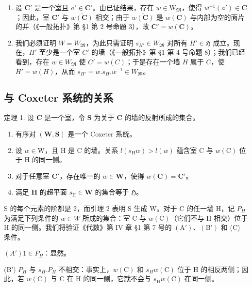 \begin{enumerate}
\def\labelenumi{(\roman{enumi})}
\setcounter{enumi}{1}
\item
设 \(\mathbf{C}'\) 是一个室且 \(a' \in \mathbf{C}'\)。由已证结果，存在 \(w \in \mathrm{W}_{\mathfrak{M}}\)，使得 \(w^{-1}(a') \in \overline{\mathbf{C}}\)；因此，室 \(\mathbf{C}'\) 与 \(\overline{w(\mathbf{C})}\) 相交；由于 \(\overline{w(\mathbf{C})}\) 是 \(w(\mathbf{C})\) 与内部为空的面片的并（《一般拓扑》第 §1 第 2 号命题 3），故 \(\mathbf{C}' = w(\mathbf{C})\)。
\item
我们必须证明 \(W = W_{\mathfrak{M}}\)，为此只需证明 \(s_{H'} \in W_{\mathfrak{M}}\) 对所有 \(H' \in \mathfrak{H}\) 成立。现在，\(H'\) 至少是一个室 \(C'\) 的墙（《一般拓扑》第 §1 第 4 号命题 8）；我们已经看到，存在 \(w \in W_{\mathfrak{M}}\) 使 \(C' = w(C)\)；于是存在一个墙 \(H\) 属于 \(C\)，使 \(H' = w(H)\)，从而 \(s_{H'} = w.s_H.w^{-1} \in W_{\mathfrak{M}}\)。
\end{enumerate}

\subsection{与 Coxeter 系统的关系}

定理 1. 设 \(\mathbf{C}\) 是一个室，令 \(\mathbf{S}\) 为关于 \(\mathbf{C}\) 的墙的反射所成的集合。

\begin{enumerate}
\def\labelenumi{(\roman{enumi})}
\item
有序对 \((\mathbf{W},\mathbf{S})\) 是一个 Coxeter 系统。
\item
设 \(w \in \mathrm{W}\)，且 \(\mathrm{H}\) 是 \(\mathrm{C}\) 的墙。关系 \(l(s_{\mathrm{H}}w) > l(w)\) 蕴含室 \(\mathrm{C}\) 与 \(w(\mathrm{C})\) 位于 \(\mathrm{H}\) 的同一侧。
\item
对于任意室 \(\mathbf{C}'\)，存在唯一的 \(w \in \mathbf{W}\)，使得 \(w(\mathbf{C}) = \mathbf{C}'\)。
\item
满足 \(\mathbf{H}\) 的超平面 \(s_{\mathrm{H}} \in \mathbf{W}\) 的集合等于 \(\mathfrak{H}\)。
\end{enumerate}

S 的每个元素的阶都是 2，而引理 2 表明 S 生成 W。对于 C 的任一墙 H，记 \(P_{H}\) 为满足下列条件的 \(w \in W\) 所成的集合：室 C 与 \(w(\mathrm{C})\)（它们不与 H 相交）位于 H 的同一侧。我们将验证《代数》第 IV 章 §1 第 7 号的 \((\mathrm{A}')\)、\((\mathrm{B}')\) 和 (C) 条件。

\((A') 1 \in P_H\)：显然。

(B') \(P_{H}\) 与 \(s_{H}.P_{H}\) 不相交：事实上，\(w(\mathrm{C})\) 和 \(s_{H}w(\mathrm{C})\) 位于 H 的相反两侧；因此，若 \(w(\mathrm{C})\) 与 C 在 H 的同一侧，它就不会与 \(s_{\mathrm{H}}w(\mathrm{C})\) 在同一侧。

